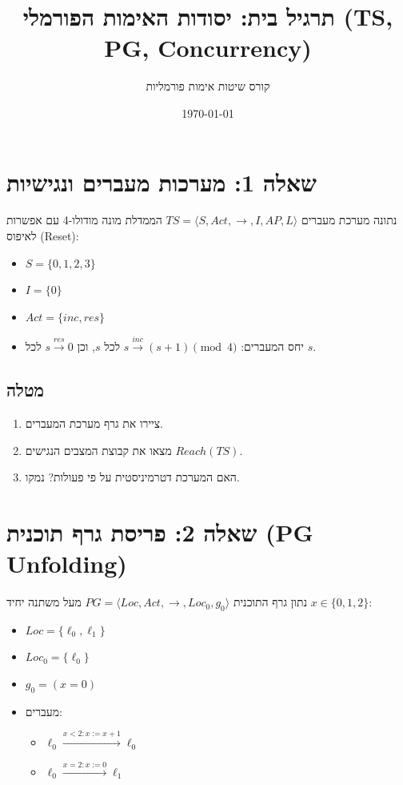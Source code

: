 \documentclass[11pt,a4paper]{article}
\title{תרגיל בית: יסודות האימות הפורמלי (TS, PG, Concurrency)}
\author{קורס שיטות אימות פורמליות}
\date{\today}
\begin{document}
\maketitle

\section{שאלה 1: מערכות מעברים ונגישיות}
נתונה מערכת מעברים $TS = \langle S, Act, \to, I, AP, L \rangle$ הממדלת מונה מודולו-4 עם אפשרות לאיפוס \textenglish{(Reset)}:
\begin{itemize}
    \item $S = \{0, 1, 2, 3\}$
    \item $I = \{0\}$
    \item $Act = \{inc, res\}$
    \item יחס המעברים: $s \xrightarrow{inc} (s+1) \pmod 4$ לכל $s$, וכן $s \xrightarrow{res} 0$ לכל $s$.
\end{itemize}

\subsection{מטלה}
\begin{enumerate}
    \item ציירו את גרף מערכת המעברים.
    \item מצאו את קבוצת המצבים הנגישים $Reach(TS)$.
    \item האם המערכת דטרמיניסטית על פי פעולות? נמקו.
\end{enumerate}

\section{שאלה 2: פריסת גרף תוכנית (PG Unfolding)}
נתון גרף התוכנית $PG = \langle Loc, Act, \to, Loc_0, g_0 \rangle$ מעל משתנה יחיד $x \in \{0, 1, 2\}$:
\begin{itemize}
    \item $Loc = \{\ell_0, \ell_1\}$
    \item $Loc_0 = \{\ell_0\}$
    \item $g_0 = (x = 0)$
    \item מעברים: 
    \begin{itemize}
        \item $\ell_0 \xrightarrow{x < 2 : x := x+1} \ell_0$
        \item $\ell_0 \xrightarrow{x = 2 : x := 0} \ell_1$
    \end{itemize}
\end{itemize}
\end{document}
